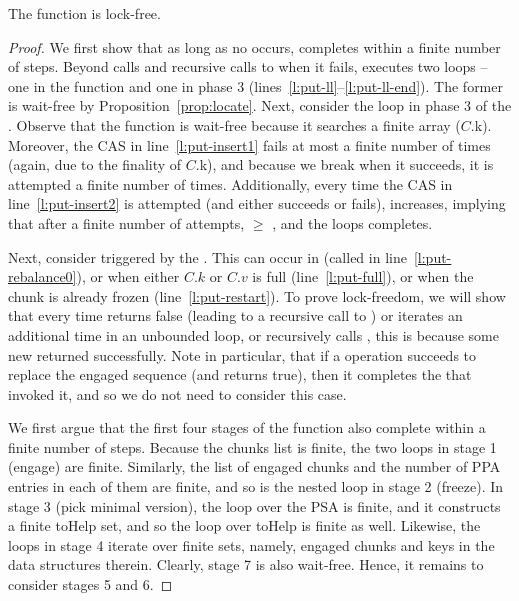 \begin{lemma}
The   function is lock-free.
\end{lemma}
\begin{proof}
We first show that as long as no  occurs,  completes within a finite number of steps. 
Beyond  calls and recursive calls to  when it fails,  executes two loops --  one in
the  function and one in phase 3 (lines~\ref{l:put-ll}--\ref{l:put-ll-end}).  
The former is wait-free by  Proposition~\ref{prop:locate}. 
Next, consider the loop in phase 3 of the . 
Observe that the  function is wait-free because it searches a finite array ($C$.k).
Moreover, the CAS in line~\ref{l:put-insert1} fails at most a finite number of times (again, due to the finality of  $C$.k),
and because we break when it succeeds, it is attempted a finite number of times. 
Additionally, every time the CAS in line~\ref{l:put-insert2} is attempted (and either succeeds or fails),    increases,
implying that after a finite number of attempts, { $ \geq$ }, and the loops completes. 

Next, consider  triggered by the . This can occur in  (called in line~\ref{l:put-rebalance0}), 
or when either $C.k$ or $C.v$ is full (line~\ref{l:put-full}), or when the chunk is already frozen (line~\ref{l:put-restart}). 
To prove lock-freedom, 
we will show that every time  returns false (leading to a recursive call to ) or iterates  
an additional time in an unbounded loop, or recursively calls , this is because some new   returned successfully. 
Note in particular, that if a   operation succeeds to replace the engaged sequence (and returns true), then it 
completes the  that invoked it, and so we do not need to consider this case.

We first argue that the first four stages of the  function also complete within a finite number of steps. 
Because the chunks list is finite, the two loops in stage 1 (engage) are finite. 
Similarly, the list of engaged chunks and the number of PPA entries in each of them are finite, and so is the nested loop in stage 2 (freeze). 
In stage 3 (pick minimal version), the loop over the PSA is finite, and it constructs a finite toHelp set, and so the loop over toHelp is finite as well.
Likewise, the loops in stage 4 iterate over finite sets, namely, engaged chunks and keys in the data structures therein.  
Clearly, stage 7 is also wait-free. 
Hence, it remains to consider stages 5 and 6.   


\end{proof}
